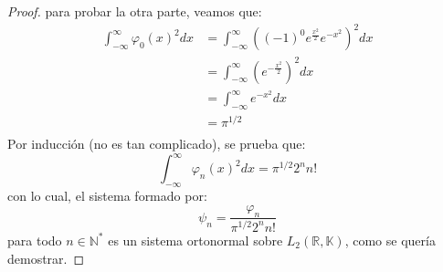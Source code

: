 \documentclass[12pt]{report}
\newcounter{it}
\theoremstyle{largebreak}
\begin{document}
\begin{proof}
        para probar la otra parte, veamos que:
        \begin{equation*}
            \begin{split}
                \int_{-\infty}^\infty\varphi_0(x)^2dx&=\int_{-\infty}^\infty\left((-1)^0e^{\frac{x^2}{2}}e^{-x^2}\right)^2 dx\\
                &=\int_{-\infty}^\infty\left(e^{-\frac{x^2}{2}}\right)^2 dx\\
                &=\int_{-\infty}^\infty e^{-x^2} dx\\
                &=\pi^{1/2}\\
            \end{split}
        \end{equation*}
        Por inducción (no es tan complicado), se prueba que:
        \begin{equation*}
            \int_{ -\infty}^\infty\varphi_n(x)^2dx=\pi^{1/2}2^n n!
        \end{equation*}
        con lo cual, el sistema formado por:
        \begin{equation*}
            \psi_n=\frac{\varphi_n}{\pi^{1/2}2^n n!}
        \end{equation*}
        para todo $n\in\mathbb{N}^*$ es un sistema ortonormal sobre $L_2(\mathbb{R},\mathbb{K})$, como se quería demostrar.

    \end{proof}
\end{document}

